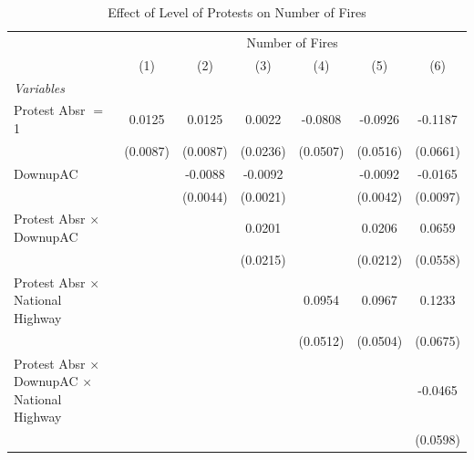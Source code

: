 
\begin{table}[htbp]
   \caption{\label{tab:protest_treat_main} Effect of Level of Protests on Number of Fires}
   \centering
   \begin{tabular}{lcccccc}
      \tabularnewline \midrule \midrule
       & \multicolumn{6}{c}{Number of Fires}\\
                                                                 & (1)           & (2)           & (3)           & (4)           & (5)           & (6)\\  
      \midrule
      \emph{Variables}\\
      Protest Absr $=$ 1                                         & 0.0125        & 0.0125        & 0.0022        & -0.0808       & -0.0926       & -0.1187\\   
                                                                 & (0.0087)      & (0.0087)      & (0.0236)      & (0.0507)      & (0.0516)      & (0.0661)\\   
      DownupAC                                                   &               & -0.0088       & -0.0092       &               & -0.0092       & -0.0165\\   
                                                                 &               & (0.0044)      & (0.0021)      &               & (0.0042)      & (0.0097)\\   
      Protest Absr $\times$ DownupAC                             &               &               & 0.0201        &               & 0.0206        & 0.0659\\   
                                                                 &               &               & (0.0215)      &               & (0.0212)      & (0.0558)\\   
      Protest Absr $\times$ National Highway                     &               &               &               & 0.0954        & 0.0967        & 0.1233\\   
                                                                 &               &               &               & (0.0512)      & (0.0504)      & (0.0675)\\   
      Protest Absr $\times$ DownupAC $\times$ National Highway   &               &               &               &               &               & -0.0465\\   
                                                                 &               &               &               &               &               & (0.0598)\\   

\end{tabular}
\end{table}
